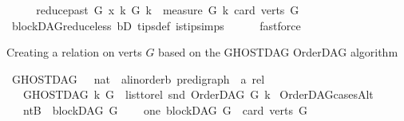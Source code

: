 \begin{isabellebody}
\ \ \isamarkupfalse%
\ \isamarkupfalse%
\ {\isachardoublequoteopen}{\isacharparenleft}{\kern0pt}{\isacharparenleft}{\kern0pt}reduce{\isacharunderscore}{\kern0pt}past\ G\ x{\isacharcomma}{\kern0pt}\ k{\isacharparenright}{\kern0pt}{\isacharcomma}{\kern0pt}\ G{\isacharcomma}{\kern0pt}\ k{\isacharparenright}{\kern0pt}\ {\isasymin}\ measure\ {\isacharparenleft}{\kern0pt}{\isasymlambda}{\isacharparenleft}{\kern0pt}G{\isacharcomma}{\kern0pt}\ k{\isacharparenright}{\kern0pt}{\isachardot}{\kern0pt}\ card\ {\isacharparenleft}{\kern0pt}verts\ G{\isacharparenright}{\kern0pt}{\isacharparenright}{\kern0pt}{\isachardoublequoteclose}\isanewline
\ \ \ \ \isamarkupfalse%
\ blockDAG{\isachardot}{\kern0pt}reduce{\isacharunderscore}{\kern0pt}less\ bD\ tips{\isacharunderscore}{\kern0pt}def\ is{\isacharunderscore}{\kern0pt}tip{\isachardot}{\kern0pt}simps\isanewline
\ \ \ \ \isamarkupfalse%
\ fastforce\ \ \isanewline
{}\isamarkupfalse%
%
\endisatagproof
{\isafoldproof}%
%
\isadelimproof
%
\endisadelimproof
%
\begin{isamarkuptext}%
Creating a relation on verts $G$ based on the GHOSTDAG OrderDAG algorithm%
\end{isamarkuptext}\isamarkuptrue%
\isamarkupfalse%
\ GHOSTDAG\ {\isacharcolon}{\kern0pt}{\isacharcolon}{\kern0pt}\ {\isachardoublequoteopen}\ nat\ {\isasymRightarrow}\ {\isacharparenleft}{\kern0pt}{\isacharprime}{\kern0pt}a{\isacharcolon}{\kern0pt}{\isacharcolon}{\kern0pt}linorder{\isacharcomma}{\kern0pt}{\isacharprime}{\kern0pt}b{\isacharparenright}{\kern0pt}\ pre{\isacharunderscore}{\kern0pt}digraph\ {\isasymRightarrow}\ {\isacharprime}{\kern0pt}a\ rel{\isachardoublequoteclose}\isanewline
\ \ \ {\isachardoublequoteopen}GHOSTDAG\ k\ G\ {\isacharequal}{\kern0pt}\ list{\isacharunderscore}{\kern0pt}to{\isacharunderscore}{\kern0pt}rel\ {\isacharparenleft}{\kern0pt}snd\ {\isacharparenleft}{\kern0pt}OrderDAG\ G\ k{\isacharparenright}{\kern0pt}{\isacharparenright}{\kern0pt}{\isachardoublequoteclose}%
\isadelimdocument
%
\endisadelimdocument
%
\isatagdocument
%
\isamarkuptrue%
%
\endisatagdocument
{\isafolddocument}%
%
\isadelimdocument
%
\endisadelimdocument
{}\isamarkupfalse%
\ OrderDAG{\isacharunderscore}{\kern0pt}casesAlt{\isacharcolon}{\kern0pt}\isanewline
\ \ \ {\isacharparenleft}{\kern0pt}ntB{\isacharparenright}{\kern0pt}\ {\isachardoublequoteopen}{\isasymnot}\ blockDAG\ G{\isachardoublequoteclose}\ \isanewline
\ \ {\isacharbar}{\kern0pt}\ {\isacharparenleft}{\kern0pt}one{\isacharparenright}{\kern0pt}\ {\isachardoublequoteopen}blockDAG\ G\ {\isasymand}\ card\ {\isacharparenleft}{\kern0pt}verts\ G{\isacharparenright}{\kern0pt}\ {\isacharequal}{\kern0pt}\ {}{\isachardoublequoteclose}\isanewline

\end{isabellebody}
